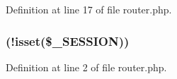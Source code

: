 \-Definition at line 17 of file router.\-php.

\hypertarget{router_8php_a8ceca98aa29914fd2479a84a8d2242fb}{
\subsubsection[{if}]{(!isset(\$\-\_\-\-S\-E\-S\-S\-I\-O\-N))}}\label{router_8php_a8ceca98aa29914fd2479a84a8d2242fb}


\-Definition at line 2 of file router.\-php.

